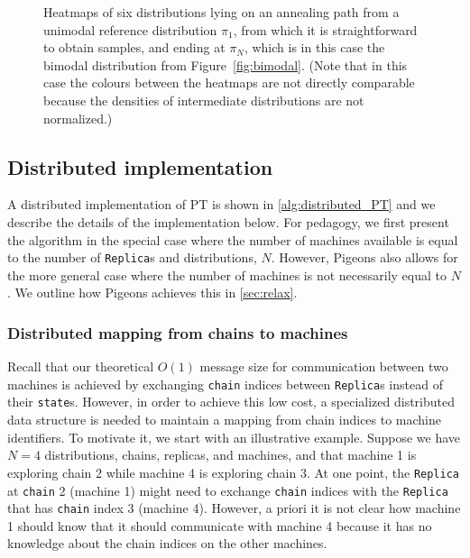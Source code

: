 \begin{figure}[t]
\begin{minipage}{0.15\textwidth}
      \caption*{$\pi_6$}
    \end{minipage}
    \caption{Heatmaps of six distributions lying on an annealing path 
    from a unimodal reference distribution  
    $\pi_1$, from which it is straightforward to obtain samples, and ending at 
    $\pi_N$, which is in this case the bimodal distribution from 
    Figure~\ref{fig:bimodal}. (Note that in this case the colours between the heatmaps 
    are not directly comparable because the densities of intermediate distributions 
    are not normalized.)}
    \label{fig:path}
\end{figure}



\subsection{Distributed implementation}
A distributed implementation of PT is shown in \cref{alg:distributed_PT}
and we describe the details of the implementation below.
For pedagogy, we first present the algorithm in the special case where the number of machines available 
is equal to the number of \texttt{Replica}s and distributions, $N$. 
However, Pigeons also allows for the more general case where the number of 
machines is not necessarily equal to $N$.
We outline how Pigeons achieves this in \cref{sec:relax}.


\subsubsection{Distributed mapping from chains to machines}
\label{sec:permuted_dist_array}
Recall that our theoretical $O(1)$ message size for communication between two machines 
is achieved by exchanging \texttt{chain} indices between \texttt{Replica}s 
instead of their \texttt{state}s. 
However, in order to achieve this low cost, a specialized distributed data structure is 
needed to maintain a mapping from chain indices to machine identifiers. 
To motivate it, we start with an illustrative example. 
Suppose we have $N=4$ distributions, chains, replicas, and machines, and that 
machine 1 is exploring chain 2 while machine 4 is exploring chain 3.
At one point, the \texttt{Replica} at \texttt{chain} 2 (machine 1) might need to exchange
\texttt{chain} indices with the \texttt{Replica} that has \texttt{chain} index 3 (machine 4). 
However, a priori it is not clear how machine 1 should know that it should communicate 
with machine 4 because it has no knowledge about the chain indices on the other machines.


